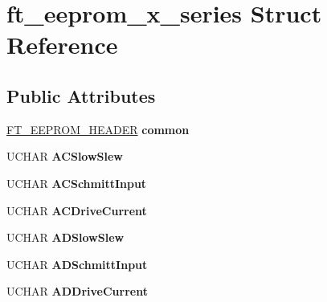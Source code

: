 \hypertarget{structft__eeprom__x__series}{}\section{ft\+\_\+eeprom\+\_\+x\+\_\+series Struct Reference}
\label{structft__eeprom__x__series}
\subsection*{Public Attributes}
\begin{DoxyCompactItemize}
\item 
\hyperlink{structft__eeprom__header}{F\+T\+\_\+\+E\+E\+P\+R\+O\+M\+\_\+\+H\+E\+A\+D\+ER} {\bfseries common}\hypertarget{structft__eeprom__x__series_a4d1ac63e7dc2e8e677edcc43b566dc01}{}\label{structft__eeprom__x__series_a4d1ac63e7dc2e8e677edcc43b566dc01}

\item 
U\+C\+H\+AR {\bfseries A\+C\+Slow\+Slew}\hypertarget{structft__eeprom__x__series_aa08fe7573f5f822e12a34973055c52e3}{}\label{structft__eeprom__x__series_aa08fe7573f5f822e12a34973055c52e3}

\item 
U\+C\+H\+AR {\bfseries A\+C\+Schmitt\+Input}\hypertarget{structft__eeprom__x__series_af0941a8b6cbcfb69a84c9e9bd9751e4e}{}\label{structft__eeprom__x__series_af0941a8b6cbcfb69a84c9e9bd9751e4e}

\item 
U\+C\+H\+AR {\bfseries A\+C\+Drive\+Current}\hypertarget{structft__eeprom__x__series_a62017256a98fdfbd1ec5a662725f9c84}{}\label{structft__eeprom__x__series_a62017256a98fdfbd1ec5a662725f9c84}

\item 
U\+C\+H\+AR {\bfseries A\+D\+Slow\+Slew}\hypertarget{structft__eeprom__x__series_a3a1988ab68373c2fdc375cb4c038666f}{}\label{structft__eeprom__x__series_a3a1988ab68373c2fdc375cb4c038666f}

\item 
U\+C\+H\+AR {\bfseries A\+D\+Schmitt\+Input}\hypertarget{structft__eeprom__x__series_addfb6cbf3c524edfbde9dbaf37f1f5e0}{}\label{structft__eeprom__x__series_addfb6cbf3c524edfbde9dbaf37f1f5e0}

\item 
U\+C\+H\+AR {\bfseries A\+D\+Drive\+Current}\hypertarget{structft__eeprom__x__series_a22a0cc77e2bf346e29d171194a91bc95}{}\label{structft__eeprom__x__series_a22a0cc77e2bf346e29d171194a91bc95}


\end{DoxyCompactItemize}
